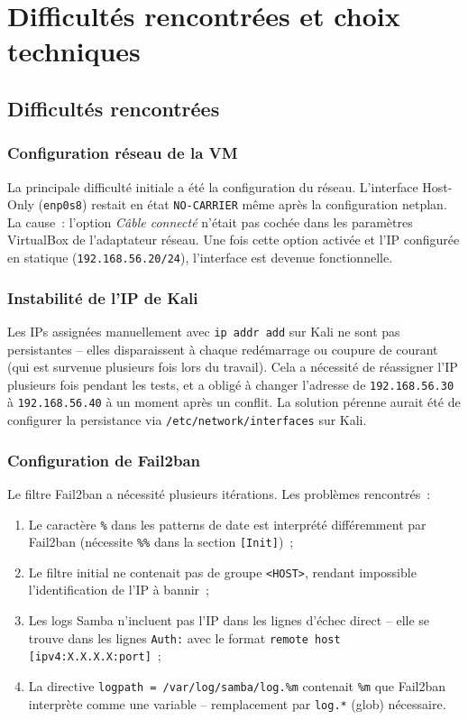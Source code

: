 \documentclass[12pt,a4paper]{article}
\begin{document}
\section{Difficultés rencontrées et choix techniques}

\subsection{Difficultés rencontrées}

\subsubsection{Configuration réseau de la VM}

La principale difficulté initiale a été la configuration du réseau. L'interface Host-Only
(\texttt{enp0s8}) restait en état \texttt{NO-CARRIER} même après la configuration netplan.
La cause~: l'option \textit{Câble connecté} n'était pas cochée dans les paramètres VirtualBox
de l'adaptateur réseau. Une fois cette option activée et l'IP configurée en statique
(\texttt{192.168.56.20/24}), l'interface est devenue fonctionnelle.

\subsubsection{Instabilité de l'IP de Kali}

Les IPs assignées manuellement avec \texttt{ip addr add} sur Kali ne sont pas persistantes
-- elles disparaissent à chaque redémarrage ou coupure de courant (qui est survenue plusieurs
fois lors du travail). Cela a nécessité de réassigner l'IP plusieurs fois pendant les tests,
et a obligé à changer l'adresse de \texttt{192.168.56.30} à \texttt{192.168.56.40} à un
moment après un conflit. La solution pérenne aurait été de configurer la persistance via
\texttt{/etc/network/interfaces} sur Kali.

\subsubsection{Configuration de Fail2ban}

Le filtre Fail2ban a nécessité plusieurs itérations. Les problèmes rencontrés~:
\begin{enumerate}[leftmargin=2em]
  \item Le caractère \texttt{\%} dans les patterns de date est interprété différemment par
    Fail2ban (nécessite \texttt{\%\%} dans la section \texttt{[Init]})~;
  \item Le filtre initial ne contenait pas de groupe \texttt{<HOST>}, rendant impossible
    l'identification de l'IP à bannir~;
  \item Les logs Samba n'incluent pas l'IP dans les lignes d'échec direct -- elle se trouve
    dans les lignes \texttt{Auth:} avec le format \texttt{remote host [ipv4:X.X.X.X:port]}~;
  \item La directive \texttt{logpath = /var/log/samba/log.\%m} contenait \texttt{\%m} que
    Fail2ban interprète comme une variable -- remplacement par \texttt{log.*} (glob) nécessaire.
\end{enumerate}
\end{document}
